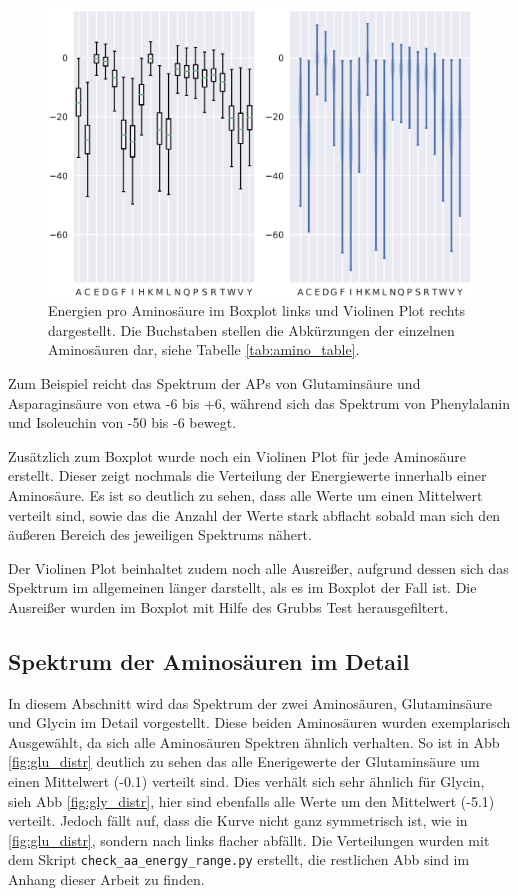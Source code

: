 \begin{figure}
    \centering
    \includegraphics[width=.99\textwidth]{images/BoxPlot_energy_rages.png}
    \caption{Energien pro Aminosäure im Boxplot links und Violinen Plot rechts dargestellt. Die Buchstaben stellen die Abkürzungen der einzelnen Aminosäuren dar, siehe Tabelle \ref{tab:amino_table}.}
    \label{fig:energy_ranges}
\end{figure}

Zum Beispiel reicht das Spektrum der \ac{APs} von Glutaminsäure und Asparaginsäure von etwa -6 bis +6, während sich das Spektrum von Phenylalanin und Isoleuchin von -50 bis -6 bewegt. 

Zusätzlich zum Boxplot wurde noch ein Violinen Plot für jede Aminosäure erstellt. Dieser zeigt nochmals die Verteilung der Energiewerte innerhalb einer Aminosäure. Es ist so deutlich zu sehen, dass alle Werte um einen Mittelwert verteilt sind, sowie das die Anzahl der Werte stark abflacht sobald man sich den äußeren Bereich des jeweiligen Spektrums nähert.

Der Violinen Plot beinhaltet zudem noch alle Ausreißer, aufgrund dessen sich das Spektrum im allgemeinen länger darstellt, als es im Boxplot der Fall ist. Die Ausreißer wurden im Boxplot mit Hilfe des Grubbs Test\cite{Jain.2010} herausgefiltert. 


\subsection{Spektrum der Aminosäuren im Detail}
In diesem Abschnitt wird das Spektrum der zwei Aminosäuren, Glutaminsäure und Glycin im Detail vorgestellt. Diese beiden Aminosäuren wurden exemplarisch Ausgewählt, da sich alle Aminosäuren Spektren ähnlich verhalten. So ist in \ac{Abb} \ref{fig:glu_distr} deutlich zu sehen das alle Enerigewerte der Glutaminsäure um einen Mittelwert (-0.1) verteilt sind. Dies verhält sich sehr ähnlich für Glycin, sieh \ac{Abb} \ref{fig:gly_distr}, hier sind ebenfalls alle Werte um den Mittelwert (-5.1) verteilt. Jedoch fällt auf, dass die Kurve nicht ganz symmetrisch ist, wie in \ref{fig:glu_distr}, sondern nach links flacher abfällt. Die Verteilungen wurden mit dem Skript \texttt{check\_aa\_energy\_range.py} erstellt, die restlichen \ac{Abb} sind im Anhang dieser Arbeit zu finden. 

